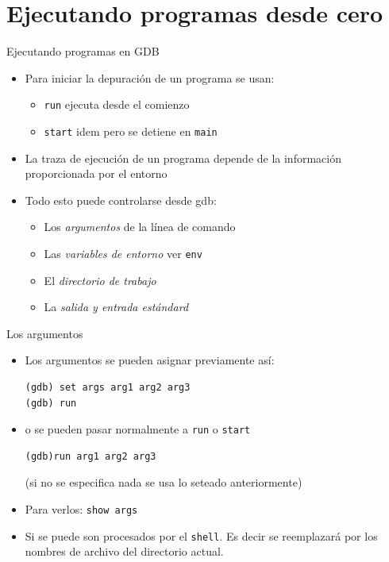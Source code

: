 \documentclass[xetex]{beamer}
\begin{document}
\section{Ejecutando programas desde cero}

\begin{frame}[fragile]{Ejecutando programas en GDB}
\begin{itemize}
\item Para iniciar la depuración de un programa se usan: 
\begin{itemize}
\item \verb=run= ejecuta desde el comienzo
\item \verb=start= idem pero se detiene en \verb=main=
\end{itemize}
\item La traza de ejecución de un programa depende de la información proporcionada por el entorno 
\item Todo esto puede controlarse desde gdb:
\begin{itemize}
\item Los {\it argumentos} de la línea de comando
\item Las {\it variables de entorno} {\small ver \verb=env=}
\item El {\it directorio de trabajo}
\item La {\it salida y entrada estándard}
\end{itemize}
\end{itemize}
\end{frame}

\begin{frame}[fragile]{Los argumentos}
\begin{itemize}
\item Los argumentos se pueden asignar previamente así:
\begin{verbatim}
(gdb) set args arg1 arg2 arg3
(gdb) run
\end{verbatim}

\item o se pueden pasar normalmente a \verb=run= o \verb=start=
\begin{verbatim}
(gdb)run arg1 arg2 arg3
\end{verbatim}
(si no se especifica nada se usa lo seteado anteriormente)
\item Para verlos: \verb=show args=
\item Si se puede son procesados por el {\tt shell}. Es decir {\tt *} se reemplazará por los
nombres de archivo del directorio actual.
\end{itemize}
\end{frame}
\end{document}
